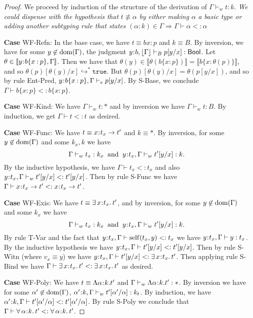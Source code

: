 \documentclass[11pt]{article}
\newcommand{\al}{\alpha}
\newcommand{\bind}{\hspace{0.05em}{:}\hspace{0.05em}} %
\newcommand{\col}{\mathbin{:}}       %
\newcommand{\lb}{\llbracket}         %
\newcommand{\rb}{\rrbracket}         %
\newcommand{\many}{\hookrightarrow^*}
\newcommand{\true}{\mathtt{true}}
\newcommand{\Bool}{{\sf Bool}}
\newcommand{\existype}[3]{\exists\, #1\bind #2.\, #3}
\newcommand{\polytype}[3]{\forall\, #1\bind #2.\, #3}
\newcommand{\functype}[3]{#1\bind #2 \rightarrow #3}
\newcommand{\dom}[1]{{\rm dom}(#1)}
\begin{document}
\begin{proof} We proceed by induction of the structure of the derivation of $\Gamma \vdash_w t : k$. {\em We could dispense with the hypothesis that $t \not\equiv \al$ by either making $\al$ a basic type or adding another subtyping rule that states $(\al\col k)\in\Gamma \Rightarrow \Gamma \vdash \al <: \al$}

{\bf Case} {\sc WF-Refn}: In the base case, we have $t \equiv b{x\col p}$ and $k \equiv B$. By inversion, we have for some $y \not\in \dom{\Gamma}$, the judgment $y\bind b, \lfloor \Gamma \rfloor \vdash_B p[y/x] : \Bool$. Let $\theta \in \lb y\bind b\{x\col p\}, \Gamma\rb$. Then we have that $\theta(y) \in \lb\theta(b\{x\col p\})\rb = \lb b\{x\col \theta(p)\}\rb$, and so $\theta(p)[\theta(y)/x] \many \true$. But $\theta(p)[\theta(y)/x] = \theta(p[y/x])$, and so by rule {\sc Ent-Pred}, $y\bind b\{x\col p\}, \Gamma \vdash_e p[y/x]$. By {\sc S-Base}, we conclude $\Gamma \vdash b\{x\col p\} <: b\{x \col p\}$.
	
{\bf Case} {\sc WF-Kind}:  We have $\Gamma \vdash_w t : *$ and by inversion we have $\Gamma \vdash_w t : B$. By induction, we get $\Gamma \vdash t <: t$ as desired.

{\bf Case} {\sc WF-Func}:  We have $t \equiv \functype{x}{t_x}{t'}$ and $k \equiv *$. By inversion, for some $y \not\in\dom{\Gamma}$ and some $k_x, k$ we have
\[
\Gamma\vdash_w t_x : k_x \;\;{\rm and}\;\; y\bind t_x,\Gamma \vdash_w t'[y/x] : k.
\]
By the inductive hypothesis, we have $\Gamma \vdash t_x <: t_x$ and also $y\bind t_x, \Gamma \vdash_w t'[y/x] <: t'[y/x]$. Then by rule {\sc S-Func} we have $\Gamma \vdash \functype{x}{t_x}{t'} <: \functype{x}{t_x}{t'}$.

{\bf Case} {\sc WF-Exis}:  We have $t \equiv \existype{x}{t_x}{t'}$, and by inversion, for some $y \not\in\dom{\Gamma}$ and some $k_x$ we have
\[
\Gamma\vdash_w t_x : k_x \;\;{\rm and}\;\; y\bind t_x,\Gamma \vdash_w t'[y/x] : k.
\]
By rule {\sc T-Var} and the fact that $y\bind t_x, \Gamma \vdash {\rm self}(t_x, y) <: t_x$ we have $y\bind t_x, \Gamma \vdash y : t_x$. By the inductive hypothesis we have $y\bind t_x, \Gamma \vdash t'[y/x] <: t'[y/x]$. 
Then by rule {\sc S-Witn} (where $v_x \equiv y$) we have $y\bind t_x, \Gamma \vdash t'[y/x] <: \existype{x}{t_x}{t'}$. Then applying rule {\sc S-Bind} we have $\Gamma \vdash \existype{x}{t_x}{t'} <: \existype{x}{t_x}{t'}$ as desired.

{\bf Case} {\sc WF-Poly}: We have $t \equiv \Lambda\al\bind k.t'$ and $\Gamma \vdash_w\Lambda\al\bind k.t' : *$. By inversion we have for some $\al' \not \in {\rm dom}(\Gamma)$, 
$\al'\bind k, \Gamma\vdash_w t'[\al'/\al]: k_t$. By induction, we have
$\al'\bind k, \Gamma\vdash t'[\al'/\al] <: t'[\al'/\al]$. By rule {\sc S-Poly} we conclude that $\Gamma \vdash \polytype{\al}{k}{t'} <: \polytype{\al}{k}{t'}$.
\end{proof}
\end{document}
